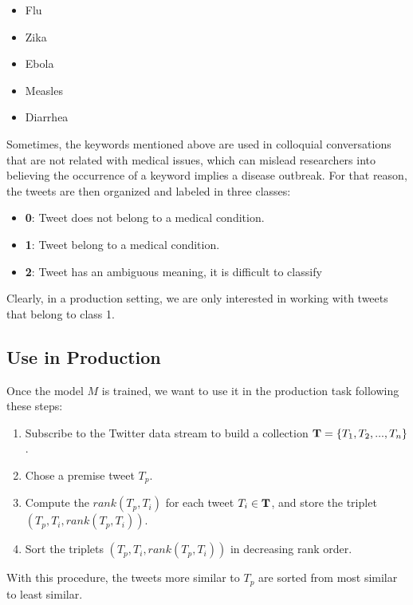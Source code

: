 \documentclass[12pt]{report}
\begin{document}
\begin{itemize}[nolistsep]
	\item Flu
	\item Zika
	\item Ebola
	\item Measles
	\item Diarrhea  
\end{itemize}

Sometimes, the keywords mentioned above are used in colloquial conversations that are not related with medical 
issues, which can mislead researchers into believing the occurrence of a keyword implies a disease outbreak. 
For that reason, the tweets are then organized and labeled in three classes:

\begin{itemize}[nolistsep]
	\item \textbf{0}: Tweet does not belong to a medical condition.
	\item  \textbf{1}: Tweet belong to a medical condition.
	\item \textbf{2}: Tweet has an ambiguous meaning, it is difficult to classify 
\end{itemize}

Clearly, in a production setting, we are only interested in working with tweets that belong to class 1. 

\subsection{Use in Production}
Once the model $M$ is trained, we want to use it in the production task following these steps:

\begin{enumerate}
	\item Subscribe to the Twitter data stream to build a collection ${\bf T} = \{T_1, T_2, ..., T_n\}$.
	\item Chose a premise tweet $T_p$.
	\item Compute the $rank(T_p, T_i) $ for each tweet $T_i \in {\bf T}$, and store the triplet $(T_p, T_i, rank(T_p, T_i))$.
	\item Sort the triplets $(T_p, T_i, rank(T_p, T_i))$ in decreasing rank order.
\end{enumerate}

With this procedure, the tweets more similar to $T_p$ are sorted from most similar to least similar.
\end{document}
